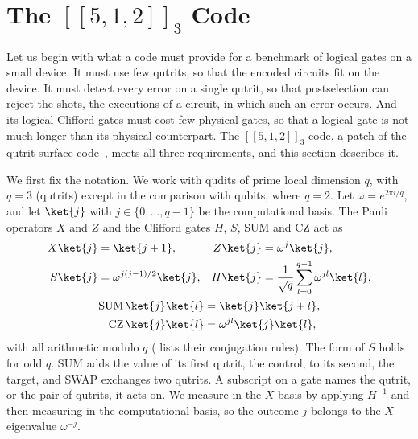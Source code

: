 \section{The \texorpdfstring{$[[5,1,2]]_3$}{[[5,1,2]]3} Code}
\label{sub:code}\label{sec: error detection code}\label{sec:method}

Let us begin with what a code must provide for a benchmark of logical gates on a small device. It must use few qutrits, so that the encoded circuits fit on the device. It must detect every error on a single qutrit, so that postselection can reject the shots, the executions of a circuit, in which such an error occurs. And its logical Clifford gates must cost few physical gates, so that a logical gate is not much longer than its physical counterpart. The $[[5,1,2]]_3$ code, a patch of the qutrit surface code~\cite{Moussa2016}, meets all three requirements, and this section describes it.

\label{sub:conventions}We first fix the notation. We work with qudits of prime local dimension $q$, with $q = 3$ (qutrits) except in the comparison with qubits, where $q = 2$. Let $\omega = e^{2\pi i/q}$, and let $\ket{j}$ with $j \in \{0, \dots, q-1\}$ be the computational basis. The Pauli operators $X$ and $Z$ and the Clifford gates $H$, $S$, SUM and CZ act as
\begin{equation}
  \begin{gathered}
    \begin{aligned}
      X\ket{j} &= \ket{j+1}, & Z\ket{j} &= \omega^{j}\ket{j}, \\
      S\ket{j} &= \omega^{j(j-1)/2}\ket{j}, & H\ket{j} &= \frac{1}{\sqrt{q}}\sum_{l=0}^{q-1}\omega^{jl}\ket{l},
    \end{aligned} \\
    \begin{aligned}
      \mathrm{SUM}\,\ket{j}\ket{l} &= \ket{j}\ket{j+l}, \\
      \mathrm{CZ}\,\ket{j}\ket{l} &= \omega^{jl}\ket{j}\ket{l},
    \end{aligned}
  \end{gathered}
  \label{eq:conventions}
\end{equation}
with all arithmetic modulo $q$ ( lists their conjugation rules). The form of $S$ holds for odd $q$. SUM adds the value of its first qutrit, the control, to its second, the target, and SWAP exchanges two qutrits. A subscript on a gate names the qutrit, or the pair of qutrits, it acts on. We measure in the $X$ basis by applying $H^{-1}$ and then measuring in the computational basis, so the outcome $j$ belongs to the $X$ eigenvalue $\omega^{-j}$.

